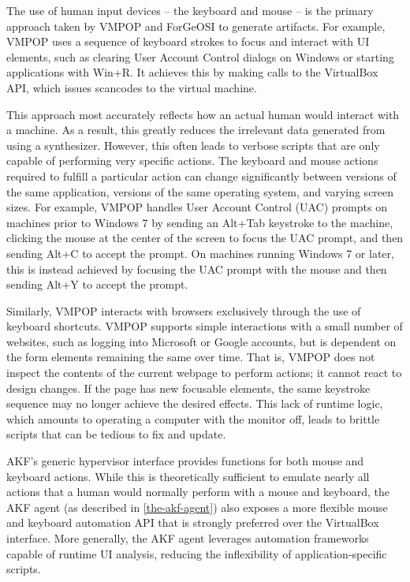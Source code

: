 \documentclass[letterpaper,12pt]{report}
\begin{document}
The use of human input devices -- the keyboard and mouse -- is the
primary approach taken by VMPOP \cite{parkTREDEVMPOPCultivating2018}
and ForGeOSI \cite{maxfraggMaxfraggForGeOSI2023} to generate
artifacts. For example, VMPOP uses a sequence of keyboard strokes to
focus and interact with UI elements, such as clearing User Account
Control dialogs on Windows or starting applications with Win+R. It
achieves this by making calls to the VirtualBox API, which issues
scancodes to the virtual machine.

This approach most accurately reflects how an actual human would
interact with a machine. As a result, this greatly reduces the
irrelevant data generated from using a synthesizer. However, this often
leads to verbose scripts that are only capable of performing very
specific actions. The keyboard and mouse actions required to fulfill a
particular action can change significantly between versions of the same
application, versions of the same operating system, and varying screen
sizes. For example, VMPOP handles User Account Control (UAC) prompts on
machines prior to Windows 7 by sending an Alt+Tab keystroke to the
machine, clicking the mouse at the center of the screen to focus the UAC
prompt, and then sending Alt+C to accept the prompt. On machines running
Windows 7 or later, this is instead achieved by focusing the UAC prompt
with the mouse and then sending Alt+Y to accept the prompt.

Similarly, VMPOP interacts with browsers exclusively through the use of
keyboard shortcuts. VMPOP supports simple interactions with a small
number of websites, such as logging into Microsoft or Google accounts,
but is dependent on the form elements remaining the same over time. That
is, VMPOP does not inspect the contents of the current webpage to
perform actions; it cannot react to design changes. If the page has new
focusable elements, the same keystroke sequence may no longer achieve
the desired effects. This lack of runtime logic, which amounts to
operating a computer with the monitor off, leads to brittle scripts that
can be tedious to fix and update.

AKF's generic hypervisor interface provides functions for both mouse and
keyboard actions. While this is theoretically sufficient to emulate
nearly all actions that a human would normally perform with a mouse and
keyboard, the AKF agent (as described in \autoref{the-akf-agent}) also exposes a more flexible mouse
and keyboard automation API that is strongly preferred over the
VirtualBox interface. More generally, the AKF agent leverages automation
frameworks capable of runtime UI analysis, reducing the inflexibility of
application-specific scripts.
\end{document}
